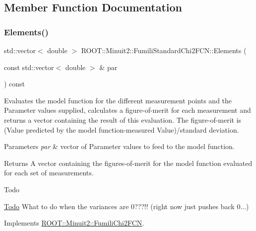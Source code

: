 \subsection{Member Function Documentation}
\mbox{\label{classROOT_1_1Minuit2_1_1FumiliStandardChi2FCN_ae7683cdbfa4160902add963d2132ab76}} 
\subsubsection{\texorpdfstring{Elements()}{Elements()}\hspace{0.1cm}{\footnotesize\ttfamily [1/3]}}
{\footnotesize\ttfamily std\+::vector$<$ double $>$ R\+O\+O\+T\+::\+Minuit2\+::\+Fumili\+Standard\+Chi2\+F\+C\+N\+::\+Elements (\begin{DoxyParamCaption}\item[{const std\+::vector$<$ double $>$ \&}]{par }\end{DoxyParamCaption}) const\hspace{0.3cm}{\ttfamily [virtual]}}

Evaluates the model function for the different measurement points and the Parameter values supplied, calculates a figure-\/of-\/merit for each measurement and returns a vector containing the result of this evaluation. The figure-\/of-\/merit is (Value predicted by the model function-\/measured Value)/standard deviation.


\begin{DoxyParams}{Parameters}
{\em par} & vector of Parameter values to feed to the model function.\\
\hline
\end{DoxyParams}
\begin{DoxyReturn}{Returns}
A vector containing the figures-\/of-\/merit for the model function evaluated for each set of measurements.
\end{DoxyReturn}
\begin{DoxyRefDesc}{Todo}
\item[\mbox{\hyperlink{todo__todo000010}{Todo}}]What to do when the variances are 0???!! (right now just pushes back 0...)\end{DoxyRefDesc}


Implements \mbox{\hyperlink{classROOT_1_1Minuit2_1_1FumiliChi2FCN_a25cc8dcc2eff831b3c0a94bf5413c2cd}{R\+O\+O\+T\+::\+Minuit2\+::\+Fumili\+Chi2\+F\+CN}}.


